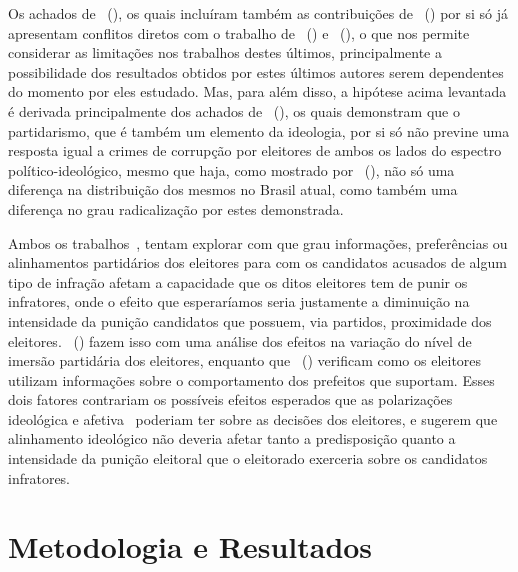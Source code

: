 \documentclass[
	12pt,				%
	openright,			%
	twoside,			%
	a4paper,			%
	openany,
	english,			%
	brazil				%
	]{abntex2}
\begin{document}
Os achados de ~(\citeyear{dunning2019voter}), os quais incluíram também as contribuições de ~(\citeyear{Boas2019Apr}) por si só já apresentam conflitos diretos com o trabalho de ~(\citeyear{ferraz2008exposing}) e ~(\citeyear{Avis2018Oct}), o que nos permite considerar as limitações nos trabalhos destes últimos, principalmente a possibilidade dos resultados obtidos por estes últimos autores serem dependentes do momento por eles estudado. Mas, para além disso, a hipótese acima levantada é derivada principalmente dos achados de ~(\citeyear{Botero2021Apr}), os quais demonstram que o partidarismo, que é também um elemento da ideologia, por si só não previne uma resposta igual a crimes de corrupção por eleitores de ambos os lados do espectro político-ideológico, mesmo que haja, como mostrado por ~(\citeyear{fuks2020afeto}), não só uma diferença na distribuição dos mesmos no Brasil atual, como também uma diferença no grau radicalização por estes demonstrada. 

Ambos os trabalhos~\cite{Boas2019Apr, Botero2021Apr}, tentam explorar com que grau informações, preferências ou alinhamentos partidários dos eleitores para com os candidatos acusados de algum tipo de infração afetam a capacidade que os ditos eleitores tem de punir os infratores, onde o efeito que esperaríamos seria justamente a diminuição na intensidade da punição candidatos que possuem, via partidos, proximidade dos eleitores. ~(\citeyear{Botero2021Apr}) fazem isso com uma análise dos efeitos na variação do nível de imersão partidária dos eleitores, enquanto que ~(\citeyear{Boas2019Apr}) verificam como os eleitores utilizam informações sobre o comportamento dos prefeitos que suportam. Esses dois fatores contrariam os possíveis efeitos esperados que as polarizações ideológica e afetiva~\cite{fuks2020afeto} poderiam ter sobre as decisões dos eleitores, e sugerem que alinhamento ideológico não deveria afetar tanto a predisposição quanto a intensidade da punição eleitoral que o eleitorado exerceria sobre os candidatos infratores.


\chapter{Metodologia e Resultados}
\end{document}
